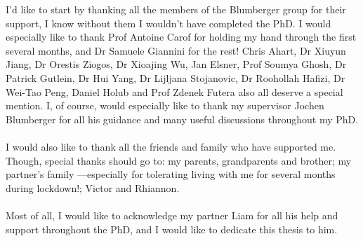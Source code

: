 \begin{acknowledgements}
I'd like to start by thanking all the members of the Blumberger group for their support, I know without them I wouldn't have completed the PhD. I would especially like to thank Prof Antoine Carof for holding my hand through the first several months, and Dr Samuele Giannini for the rest! Chris Ahart, Dr Xiuyun Jiang, Dr Orestis Ziogos, Dr Xioajing Wu, Jan Elsner, Prof Soumya Ghosh, Dr Patrick Gutlein, Dr Hui Yang, Dr Lijljana Stojanovic, Dr Roohollah Hafizi, Dr Wei-Tao Peng, Daniel Holub and Prof Zdenek Futera also all deserve a special mention. I, of course, would especially like to thank my supervisor Jochen Blumberger for all his guidance and many useful discussions throughout my PhD.
\\\\
I would also like to thank all the friends and family who have supported me. Though, special thanks should go to: my parents, grandparents and brother; my partner's family ---especially for tolerating  living with me for several months during lockdown!; Victor and Rhiannon.
\\\\
Most of all, I would like to acknowledge my partner Liam for all his help and support throughout the PhD, and I would like to dedicate this thesis to him.
\end{acknowledgements}

\setcounter{tocdepth}{2} 

\tableofcontents
\listoffigures
\listoftables

